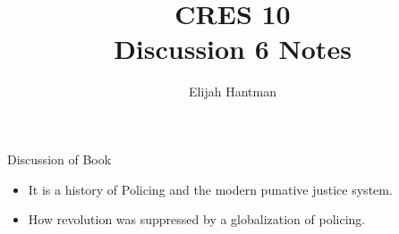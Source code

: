 \documentclass{report}
\title{\Huge{CRES 10}\\Discussion 6 Notes}
\author{\huge{Elijah Hantman}}
\date{}
\begin{document}
\maketitle
\newpage

\begin{description}
    \item Discussion of Book 
        \begin{itemize}
            \item It is a history of Policing and
                the modern punative justice system.
            \item How revolution was suppressed by
                a globalization of policing.
        \end{itemize}
\end{description}
\end{document}
